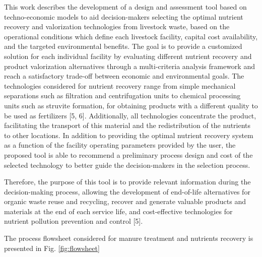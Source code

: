\documentclass[10pt,a4paper]{article}
\begin{document}
This work describes the development of a design and assessment tool based on techno-economic models to aid decision-makers selecting the optimal nutrient recovery and valorization technologies from livestock waste, based on the operational conditions which define each livestock facility, capital cost availability, and the targeted environmental benefits. The goal is to provide a customized solution for each individual facility by evaluating different nutrient recovery and product valorization alternatives through a multi-criteria analysis framework and reach a satisfactory trade-off between economic and environmental goals. The technologies considered for nutrient recovery range from simple mechanical separations such as filtration and centrifugation units to chemical processing units such as struvite formation, for obtaining products with a different quality to be used as fertilizers [5, 6]. Additionally, all technologies concentrate the product, facilitating the transport of this material and the redistribution of the nutrients to other locations. In addition to providing the optimal nutrient recovery system as a function of the facility operating parameters provided by the user, the proposed tool is able to recommend a preliminary process design and cost of the selected technology to better guide the decision-makers in the selection process.

Therefore, the purpose of this tool is to provide relevant information during the decision-making process, allowing the development of end-of-life alternatives for organic waste reuse and recycling, recover and generate valuable products and materials at the end of each service life, and cost-effective technologies for nutrient pollution prevention and control [5].














The process flowsheet considered for manure treatment and nutrients recovery is presented in Fig. \ref{fig:flowsheet}
\end{document}
